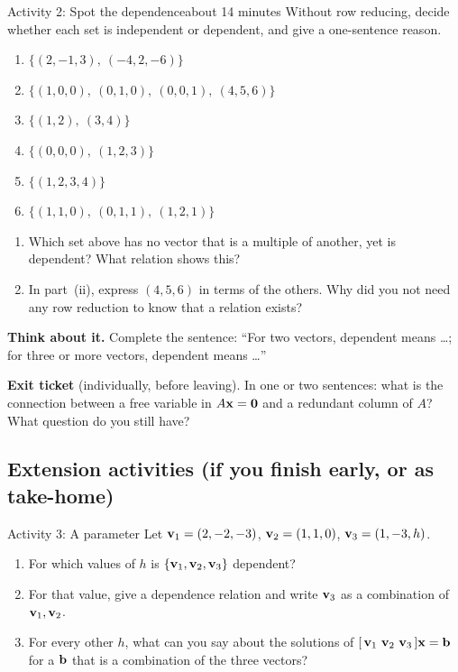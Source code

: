\documentclass[11pt]{article}
\begin{document}
\newpage
\begin{activity}{Activity 2: Spot the dependence}{about 14 minutes}
Without row reducing, decide whether each set is independent or dependent, and give a one-sentence reason.
\begin{enumerate}[label=(\roman*),itemsep=6pt]
  \item $\{(2,-1,3),\ (-4,2,-6)\}$
  \item $\{(1,0,0),\ (0,1,0),\ (0,0,1),\ (4,5,6)\}$
  \item $\{(1,2),\ (3,4)\}$
  \item $\{(0,0,0),\ (1,2,3)\}$
  \item $\{(1,2,3,4)\}$
  \item $\{(1,1,0),\ (0,1,1),\ (1,2,1)\}$
\end{enumerate}
\answerline
\begin{enumerate}[label=(\alph*),itemsep=6pt,start=1]
  \item Which set above has no vector that is a multiple of another, yet is dependent? What relation shows this?
        \answerline
  \item In part~(ii), express $(4,5,6)$ in terms of the others. Why did you not need any row reduction to know that a relation exists?
        \answerline
\end{enumerate}
\textbf{Think about it.} Complete the sentence: ``For two vectors, dependent means \dots; for three or more vectors, dependent means \dots''
\answerline\answerline
\end{activity}

\textbf{Exit ticket} (individually, before leaving). In one or two sentences: what is the connection between a free variable in $A\mathbf{x}=\mathbf{0}$ and a redundant column of $A$? What question do you still have?
\answerline\answerline

\newpage
\subsection*{Extension activities \quad (if you finish early, or as take-home)}

\begin{ext}{Activity 3: A parameter}{}
Let $\mathbf{v}_1=(2,-2,-3)$, $\mathbf{v}_2=(1,1,0)$, $\mathbf{v}_3=(1,-3,h)$.
\begin{enumerate}[label=(\alph*),itemsep=6pt]
  \item For which values of $h$ is $\{\mathbf{v}_1,\mathbf{v}_2,\mathbf{v}_3\}$ dependent?
  \item For that value, give a dependence relation and write $\mathbf{v}_3$ as a combination of $\mathbf{v}_1,\mathbf{v}_2$.
  \item For every other $h$, what can you say about the solutions of $[\,\bv{v}_1\ \bv{v}_2\ \bv{v}_3\,]\bv{x}=\bv{b}$ for a $\mathbf{b}$ that is a combination of the three vectors?
\end{enumerate}
\workspace{1.8in}
\end{ext}
\end{document}
